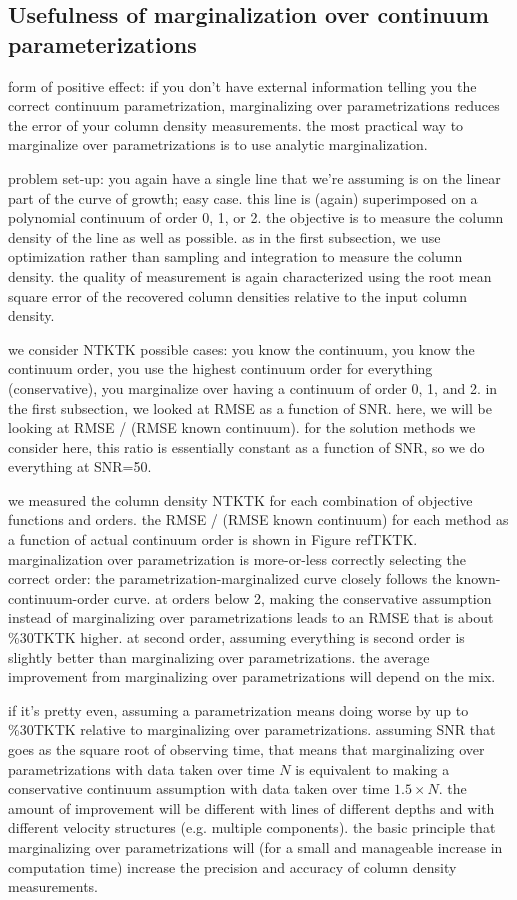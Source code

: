 \documentclass[manuscript]{aastex62}
\begin{document}
\subsection{Usefulness of marginalization over continuum parameterizations}
form of positive effect: if you don't have external information telling you the correct continuum parametrization, marginalizing over parametrizations reduces the error of your column density measurements.
the most practical way to marginalize over parametrizations is to use analytic marginalization.

problem set-up: you again have a single line that we're assuming is on the linear part of the curve of growth; easy case.
this line is (again) superimposed on a polynomial continuum of order 0, 1, or 2.
the objective is to measure the column density of the line as well as possible.
as in the first subsection, we use optimization rather than sampling and integration to measure the column density.
the quality of measurement is again characterized using the root mean square error of the recovered column densities relative to the input column density.

we consider NTKTK possible cases: you know the continuum, you know the continuum order, you use the highest continuum order for everything (conservative), you marginalize over having a continuum of order 0, 1, and 2.
in the first subsection, we looked at RMSE as a function of SNR.
here, we will be looking at RMSE / (RMSE known continuum).
for the solution methods we consider here, this ratio is essentially constant as a function of SNR, so we do everything at SNR=50.

we measured the column density NTKTK for each combination of objective functions and orders.
the RMSE / (RMSE known continuum) for each method as a function of actual continuum order is shown in Figure refTKTK.
marginalization over parametrization is more-or-less correctly selecting the correct order: the parametrization-marginalized curve closely follows the known-continuum-order curve.
at orders below 2, making the conservative assumption instead of marginalizing over parametrizations leads to an RMSE that is about \%30TKTK higher.
at second order, assuming everything is second order is slightly better than marginalizing over parametrizations.
the average improvement from marginalizing over parametrizations will depend on the mix.

if it's pretty even, assuming a parametrization means doing worse by up to \%30TKTK relative to marginalizing over parametrizations.
assuming SNR that goes as the square root of observing time, that means that marginalizing over parametrizations with data taken over time $N$ is equivalent to making a conservative continuum assumption with data taken over time $1.5 \times N$.
the amount of improvement will be different with lines of different depths and with different velocity structures (e.g. multiple components).
the basic principle that marginalizing over parametrizations will (for a small and manageable increase in computation time) increase the precision and accuracy of column density measurements.
\end{document}
